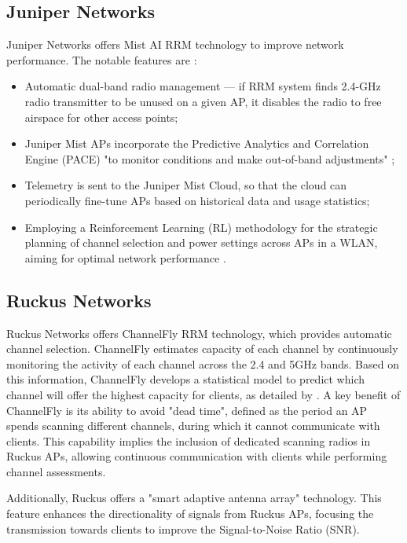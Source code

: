 \subsection{Juniper Networks}
Juniper Networks offers Mist AI RRM technology to improve network performance. The notable features are \cite{junipernetworksUnderstandingRadioResource2023,RadioManagementTechnology}:
\begin{itemize}
    \item Automatic dual-band radio management --- if RRM system finds 2.4-GHz radio transmitter to be unused on a given AP, it disables the radio to free airspace for other access points;
    \item Juniper Mist APs incorporate the Predictive Analytics and Correlation Engine (PACE) "to monitor conditions and make out-of-band adjustments" \cite{RadioManagementTechnology};
    \item Telemetry is sent to the Juniper Mist Cloud, so that the cloud can periodically fine-tune APs based on historical data and usage statistics;
    \item Employing a Reinforcement Learning (RL) methodology for the strategic planning of channel selection and power settings across APs in a WLAN, aiming for optimal network performance \cite{junipernetworksUnderstandingRadioResource2023}.
\end{itemize}

\subsection{Ruckus Networks}
Ruckus Networks offers ChannelFly RRM technology, which provides automatic channel selection. ChannelFly estimates capacity of each channel by continuously monitoring the activity of each channel across the 2.4 and 5GHz bands. Based on this information, ChannelFly develops a statistical model to predict which channel will offer the highest capacity for clients, as detailed by \cite{RuckusChannelFlyFeature2023}. A key benefit of ChannelFly is its ability to avoid "dead time", defined as the period an AP spends scanning different channels, during which it cannot communicate with clients. This capability implies the inclusion of dedicated scanning radios in Ruckus APs, allowing continuous communication with clients while performing channel assessments.

Additionally, Ruckus offers a "smart adaptive antenna array" technology. This feature enhances the directionality of signals from Ruckus APs, focusing the transmission towards clients to improve the Signal-to-Noise Ratio (SNR).

